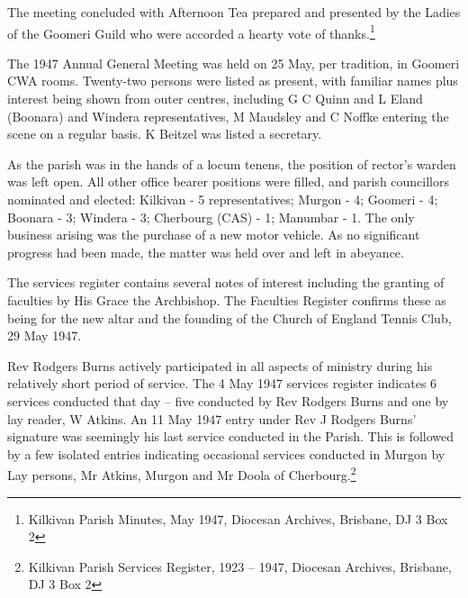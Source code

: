 The meeting concluded with Afternoon Tea prepared and presented by the Ladies of the Goomeri Guild who were accorded a hearty vote of thanks.\footnote{Kilkivan Parish Minutes, May 1947, Diocesan Archives, Brisbane, DJ 3 Box 2}


The 1947 Annual General Meeting was held on 25 May, per tradition, in Goomeri CWA rooms. Twenty-two persons were listed as present, with familiar names plus interest being shown from outer centres, including G C Quinn and L Eland (Boonara) and Windera representatives, M Maudsley and C Noffke entering the scene on a regular basis. K Beitzel was listed a secretary.



As the parish was in the hands of a locum tenens, the position of rector's warden was left open. All other office bearer positions were filled, and parish councillors nominated and elected: Kilkivan - 5 representatives; Murgon - 4; Goomeri - 4; Boonara - 3; Windera - 3; Cherbourg (CAS) - 1; Manumbar - 1. The only business arising was the purchase of a new motor vehicle. As no significant progress had been made, the matter was held over and left in abeyance.



The services register contains several notes of interest including the granting of faculties by His Grace the Archbishop. The Faculties Register confirms these as being for the new altar and the founding of the Church of England Tennis Club, 29 May 1947.



Rev Rodgers Burns actively participated in all aspects of ministry during his relatively short period of service. The 4 May 1947 services register indicates 6 services conducted that day -- five conducted by Rev Rodgers Burns and one by lay reader, W Atkins. An 11 May 1947 entry under Rev J Rodgers Burns' signature was seemingly his last service conducted in the Parish. This is followed by a few isolated entries indicating occasional services conducted in Murgon by Lay persons, Mr Atkins, Murgon and Mr Doola of Cherbourg.\footnote{Kilkivan Parish Services Register, 1923 -- 1947, Diocesan Archives, Brisbane, DJ 3 Box 2}


